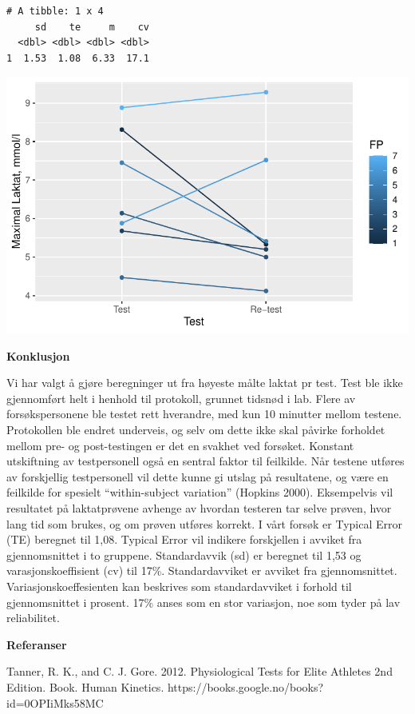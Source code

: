 \documentclass[
  letterpaper,
  DIV=11,
  numbers=noendperiod]{scrreprt}
\begin{document}
\begin{verbatim}
# A tibble: 1 x 4
     sd    te     m    cv
  <dbl> <dbl> <dbl> <dbl>
1  1.53  1.08  6.33  17.1
\end{verbatim}

\includegraphics{./part1_files/figure-pdf/unnamed-chunk-8-1.pdf}

\textbf{Konklusjon}

Vi har valgt å gjøre beregninger ut fra høyeste målte laktat pr test.
Test ble ikke gjennomført helt i henhold til protokoll, grunnet tidsnød
i lab. Flere av forsøkspersonene ble testet rett hverandre, med kun 10
minutter mellom testene. Protokollen ble endret underveis, og selv om
dette ikke skal påvirke forholdet mellom pre- og post-testingen er det
en svakhet ved forsøket. Konstant utskiftning av testpersonell også en
sentral faktor til feilkilde. Når testene utføres av forskjellig
testpersonell vil dette kunne gi utslag på resultatene, og være en
feilkilde for spesielt ``within-subject variation'' (Hopkins 2000).
Eksempelvis vil resultatet på laktatprøvene avhenge av hvordan testeren
tar selve prøven, hvor lang tid som brukes, og om prøven utføres
korrekt. I vårt forsøk er Typical Error (TE) beregnet til 1,08. Typical
Error vil indikere forskjellen i avviket fra gjennomsnittet i to
gruppene. Standardavvik (sd) er beregnet til 1,53 og
varasjonskoeffisient (cv) til 17\%. Standardavviket er avviket fra
gjennomsnittet. Variasjonskoeffesienten kan beskrives som
standardavviket i forhold til gjennomsnittet i prosent. 17\% anses som
en stor variasjon, noe som tyder på lav reliabilitet.

\textbf{Referanser}

Tanner, R. K., and C. J. Gore. 2012. Physiological Tests for Elite
Athletes 2nd Edition. Book. Human Kinetics.
https://books.google.no/books?id=0OPIiMks58MC
\end{document}

